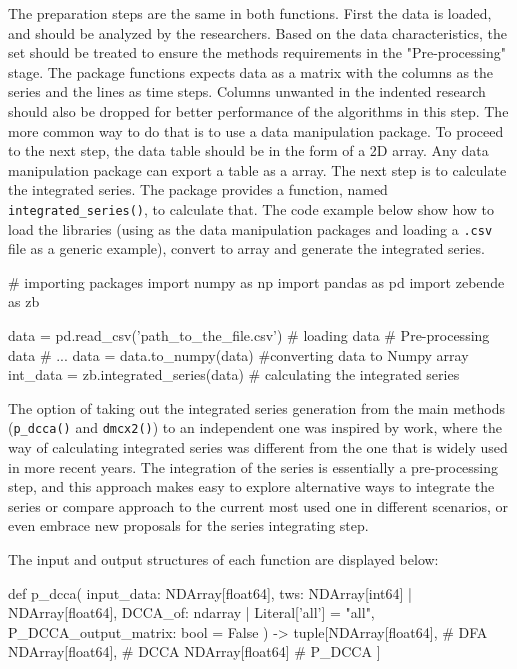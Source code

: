 \documentclass[nojss]{jss}
\begin{document}
The preparation steps are the same in both functions. First the data is loaded, and should be analyzed by the researchers. Based on the data characteristics, the set should be treated to ensure the methods requirements in the "Pre-processing" stage. The package functions expects data as a matrix with the columns as the series and the lines as time steps. Columns unwanted in the indented research should also be dropped for better performance of the algorithms in this step. The more common way to do that is to use a data manipulation package. To proceed to the next step, the data table should be in the form of a  2D array. Any data manipulation  package can export a table as a  array. The next step is to calculate the integrated series. The package provides a function, named \verb"integrated_series()", to calculate that. The code example below show how to load the libraries (using  as the data manipulation packages and loading a \verb".csv" file as a generic example), convert to  array and generate the integrated series.

\begin{Code}
# importing packages
import numpy as np
import pandas as pd
import zebende as zb

data = pd.read_csv('path_to_the_file.csv') # loading data
# Pre-processing data
# ...
data = data.to_numpy(data) #converting data to Numpy array
int_data = zb.integrated_series(data) # calculating the integrated series
\end{Code}

The option of taking out the integrated series generation from the main methods (\verb"p_dcca()" and \verb"dmcx2()") to an independent one was inspired by \cite{Peng_1994} work, where the way of calculating integrated series was different from the one that is widely used in more recent years. The integration of the series is essentially a pre-processing step, and this approach makes easy to explore alternative ways to integrate the series or compare \cite{Peng_1994} approach to the current most used one in different scenarios, or even embrace new proposals for the series integrating step.

The input and output structures of each function are displayed below:

\begin{Code}
def p_dcca(
    input_data: NDArray[float64],
    tws: NDArray[int64] | NDArray[float64],
    DCCA_of: ndarray | Literal['all'] = "all",
    P_DCCA_output_matrix: bool = False
) -> tuple[NDArray[float64],  # DFA
          NDArray[float64],   # DCCA
          NDArray[float64]    # P_DCCA
          ]
\end{Code}
\end{document}
